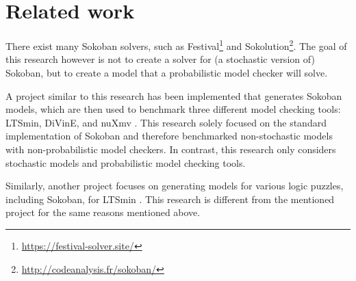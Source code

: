 \section{Related work}
There exist many Sokoban solvers, such as Festival\footnote{\url{https://festival-solver.site/}} and Sokolution\footnote{\url{http://codeanalysis.fr/sokoban/}}. The goal of this research however is not to create a solver for (a stochastic version of) Sokoban, but to create a model that a probabilistic model checker will solve.

A project similar to this research has been implemented that generates Sokoban models, which are then used to benchmark three different model checking tools: LTSmin, DiVinE, and nuXmv \cite{comparing_sokoban}. This research solely focused on the standard implementation of Sokoban and therefore benchmarked non-stochastic models with non-probabilistic model checkers. In contrast, this research only considers stochastic models and probabilistic model checking tools.

Similarly, another project focuses on generating models for various logic puzzles, including Sokoban, for LTSmin \cite{ltsmin-puzzles}. This research is different from the mentioned project for the same reasons mentioned above.
